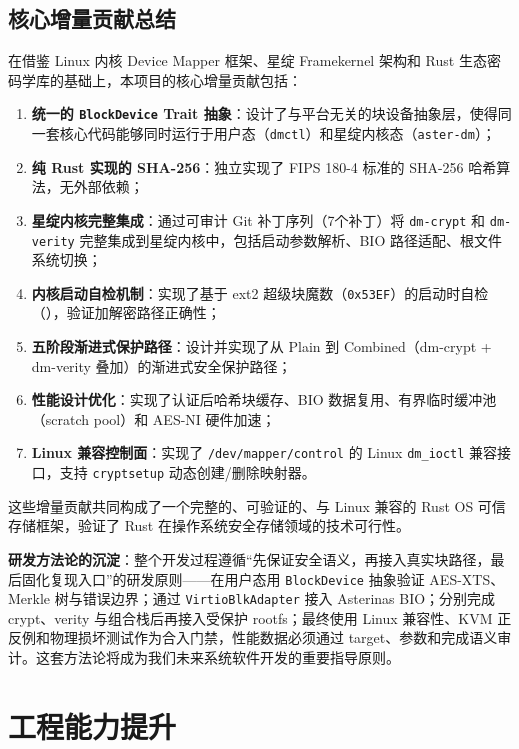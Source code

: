 \subsection{核心增量贡献总结}

在借鉴 Linux 内核 Device Mapper 框架、星绽 Framekernel 架构和 Rust 生态密码学库的基础上，本项目的核心增量贡献包括：

\begin{enumerate}
    \item \textbf{统一的 \texttt{BlockDevice} Trait 抽象}：设计了与平台无关的块设备抽象层，使得同一套核心代码能够同时运行于用户态（\texttt{dmctl}）和星绽内核态（\texttt{aster-dm}）；
    \item \textbf{纯 Rust 实现的 SHA-256}：独立实现了 FIPS 180-4 标准的 SHA-256 哈希算法，无外部依赖；
    \item \textbf{星绽内核完整集成}：通过可审计 Git 补丁序列（7个补丁）将 \texttt{dm-crypt} 和 \texttt{dm-verity} 完整集成到星绽内核中，包括启动参数解析、BIO 路径适配、根文件系统切换；
    \item \textbf{内核启动自检机制}：实现了基于 ext2 超级块魔数（\texttt{0x53EF}）的启动时自检（\texttt{}），验证加解密路径正确性；
    \item \textbf{五阶段渐进式保护路径}：设计并实现了从 Plain 到 Combined（dm-crypt + dm-verity 叠加）的渐进式安全保护路径；
    \item \textbf{性能设计优化}：实现了认证后哈希块缓存、BIO 数据复用、有界临时缓冲池（scratch pool）和 AES-NI 硬件加速；
    \item \textbf{Linux 兼容控制面}：实现了 \texttt{/dev/mapper/control} 的 Linux \texttt{dm\_ioctl} 兼容接口，支持 \texttt{cryptsetup} 动态创建/删除映射器。
\end{enumerate}

这些增量贡献共同构成了一个完整的、可验证的、与 Linux 兼容的 Rust OS 可信存储框架，验证了 Rust 在操作系统安全存储领域的技术可行性。

\textbf{研发方法论的沉淀}：整个开发过程遵循“先保证安全语义，再接入真实块路径，最后固化复现入口”的研发原则——在用户态用 \texttt{BlockDevice} 抽象验证 AES-XTS、Merkle 树与错误边界；通过 \texttt{VirtioBlkAdapter} 接入 Asterinas BIO；分别完成 crypt、verity 与组合栈后再接入受保护 rootfs；最终使用 Linux 兼容性、KVM 正反例和物理损坏测试作为合入门禁，性能数据必须通过 target、参数和完成语义审计。这套方法论将成为我们未来系统软件开发的重要指导原则。

\section{工程能力提升}

